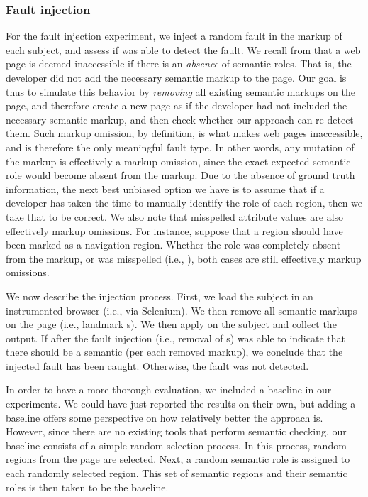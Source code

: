 

\subsubsection{Fault injection}\label{subsec:faultinjec}
For the fault injection experiment, we inject a random fault in the markup of each subject, and 
assess if \toolname was able to detect the fault. 
We recall from  that a web page 
is deemed inaccessible if there is an \emph{absence} of semantic roles. That is, the developer did not add the necessary semantic markup to the page. Our goal is thus to simulate this behavior by \emph{removing} all existing semantic markups on the page, and therefore create a new page as if the developer had not included the necessary semantic markup, and then check whether our approach can re-detect them. Such markup omission, by definition, is what makes web pages inaccessible, 
and is therefore the only meaningful fault type. 
In other words, any mutation of the markup is effectively a markup omission, 
since the exact expected semantic role would become absent from the markup. Due to the absence of ground truth information, 
the next best unbiased option we have is to assume that if a developer has taken the time to manually identify the role of each region, then we take that to be correct. 
We also note that misspelled attribute values are also effectively markup omissions. 
For instance, suppose that a region should have been marked as a navigation region. 
Whether the  role was completely absent from the markup, 
or was misspelled (i.e., ), both cases are still effectively markup omissions.

We now describe the injection process.
First, we load the subject in an instrumented browser (i.e., via Selenium). 
We then remove all semantic markups on the page 
(i.e., landmark s). 
We then apply \toolname on the subject and collect the output.  
If after the fault injection (i.e., removal of s) 
\toolname was able to indicate that there should be a semantic  (per each removed markup), 
we conclude that the injected fault has been caught. 
Otherwise, the fault was not detected. 


In order to have a more thorough evaluation, 
we included a baseline in our experiments. 
We could have just reported the results on their own, but 
adding a baseline offers some perspective on how relatively 
better the approach is. 
However, since there are no existing tools that perform 
semantic checking, 
our baseline consists of a simple random selection process. 
In this process, random regions from the page 
are selected. Next, a random semantic role is 
assigned to each randomly selected region. 
This set of semantic regions and their semantic roles 
is then taken to be the baseline.  

